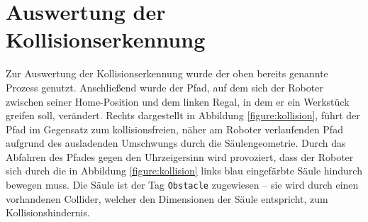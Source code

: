 \section{Auswertung der Kollisionserkennung}
\label{sec:collisionauswertung}

Zur Auswertung der Kollisionserkennung
wurde der oben bereits genannte Prozess genutzt. Anschließend wurde
der Pfad, auf dem sich der Roboter zwischen seiner Home-Position und dem linken
Regal, in dem er ein Werkstück greifen soll, verändert. Rechts dargestellt in
Abbildung \ref{figure:kollision}, führt der Pfad im Gegensatz zum
kollisionsfreien, näher am Roboter verlaufenden Pfad aufgrund des ausladenden
Umschwungs durch die Säulengeometrie. Durch das Abfahren des Pfades gegen den
Uhrzeigersinn wird provoziert, dass der Roboter sich durch die in Abbildung
\ref{figure:kollision} links blau eingefärbte Säule hindurch bewegen
muss. Die Säule ist der Tag \texttt{Obstacle} zugewiesen – sie wird
durch einen vorhandenen Collider,
welcher den Dimensionen der Säule entspricht, zum Kollisionshindernis.

